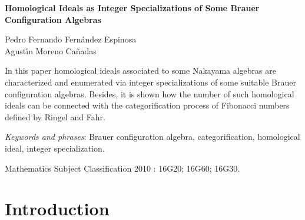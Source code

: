 \documentclass[10pt,twoside]{article}
\theoremstyle{definition}
\begin{document}
\thispagestyle{plain}
\par\bigskip
\begin{centering}

\textbf{Homological Ideals as Integer Specializations of Some Brauer Configuration Algebras}

\end{centering}\par\bigskip
\begin{centering}
\footnotesize{Pedro Fernando Fern\'andez Espinosa }\\
\footnotesize{Agust\'{\i}n Moreno Ca\~{n}adas}\\
\end{centering}
\par\bigskip
\small{In this paper homological ideals associated to some Nakayama algebras are characterized and enumerated via integer specializations of some suitable Brauer configuration algebras. Besides, it is shown how the number of such homological ideals can be connected with the categorification process of Fibonacci numbers defined by Ringel and Fahr. }
\par\bigskip
\small{\textit{Keywords and phrases}: Brauer configuration algebra,  categorification, homological ideal, integer specialization.}

\bigskip \small{Mathematics Subject Classification 2010 : 16G20; 16G60; 16G30.}


\section{Introduction}
\end{document}
